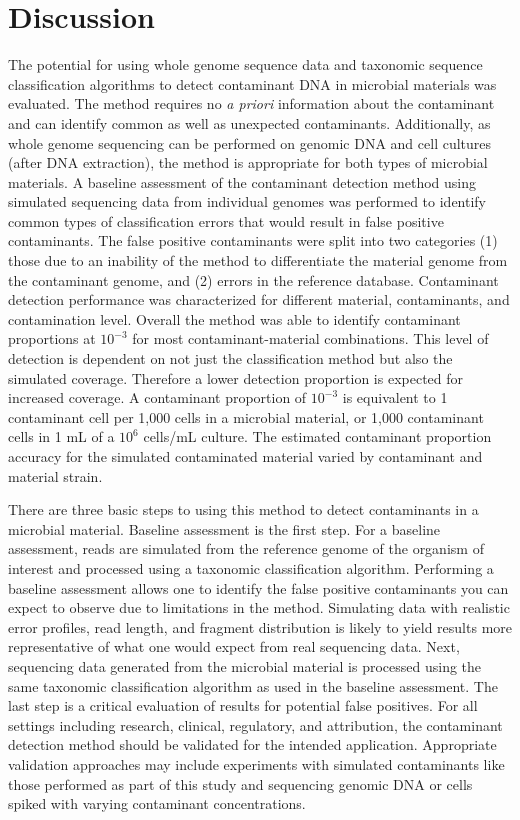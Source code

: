 \documentclass[fleqn,10pt,lineno]{wlpeerj}\usepackage[]{graphicx}\usepackage[]{color}
\begin{document}
\section*{Discussion}

The potential for using whole genome sequence data and taxonomic sequence classification algorithms to detect contaminant DNA in microbial materials was evaluated.
The method requires no \textit{a priori} information about the contaminant and can identify common as well as unexpected contaminants.
Additionally, as whole genome sequencing can be performed on genomic DNA and cell cultures (after DNA extraction), the method is appropriate for both types of microbial materials.
A baseline assessment of the contaminant detection method using simulated sequencing data from individual genomes was performed to identify common types of classification errors that would result in false positive contaminants.
The false positive contaminants were split into two categories (1) those due to an inability of the method to differentiate the material genome from the contaminant genome, and (2) errors in the reference database.
Contaminant detection performance was characterized for different material, contaminants, and contamination level.
Overall the method was able to identify contaminant proportions at $10^{-3}$ for most contaminant-material combinations. 
This level of detection is dependent on not just the classification method but also the simulated coverage. 
Therefore a lower detection proportion is expected for increased coverage. 
A contaminant proportion of $10^{-3}$ is equivalent to 1 contaminant cell per 1,000 cells in a microbial material, or 1,000 contaminant cells in 1 mL of a $10^{6}$ cells/mL culture.
The estimated contaminant proportion accuracy for the simulated contaminated material varied by contaminant and material strain.

There are three basic steps to using this method to detect contaminants in a microbial material. 
Baseline assessment is the first step. 
For a baseline assessment, reads are simulated from the reference genome of the organism of interest and processed using a taxonomic classification algorithm. 
Performing a baseline assessment allows one to identify the false positive contaminants you can expect to observe due to limitations in the method. 
Simulating data with realistic error profiles, read length, and fragment distribution is likely to yield results more representative of what one would expect from real sequencing data.
Next, sequencing data generated from the microbial material is processed using the same taxonomic classification algorithm as used in the baseline assessment. 
The last step is a critical evaluation of results for potential false positives. 
For all settings including research, clinical, regulatory, and attribution, the contaminant detection method should be validated for the intended application.
Appropriate validation approaches may include experiments with simulated contaminants like those performed as part of this study and sequencing genomic DNA or cells spiked with varying contaminant concentrations.
\end{document}
